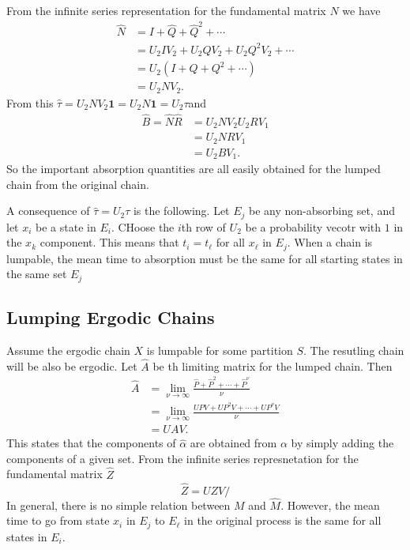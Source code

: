 \documentclass[12pt]{article}
\begin{document}
From the infinite series representation for the fundamental matrix $N$
we have
\begin{align*}
  \hat{N} &= I + \hat{Q} + \hat{Q}^2 + \cdots \\
          &= U_2 I V_2+ U_2 Q V_2 + U_2 Q^2 V_2 + \cdots \\
          &= U_2 (I +  Q  +  Q^2 + \cdots) \\
          &= U_2 N V_2.
\end{align*}
From this \( \hat{\tau} = U_2 N V_2 \mathbf{1} = U_2 N  \mathbf{1} =
U_2 \tau\)and
\begin{align*}
  \hat{B} = \hat{N} \hat{R} &= U_2 N V_2 U_2 R V_1 \\
                            &= U_2 N R V_1 \\
                            &= U_2 B V_1.
\end{align*}
So the important absorption quantities are all easily obtained for the
lumped chain from the original chain.

A consequence of $\hat{\tau} = U_2 \tau$ is the following.
Let $E_j$ be any non-absorbing set, and let $x_i$ be a state in
$E_i$.  CHoose the $i$th row of $U_2$ be a probability vecotr with $1$
in the $x_k$ component.  This means that $t_i = t_\ell$ for all $x_\ell$ in
$E_j$.  When a chain is lumpable, the mean time to absorption must be
the same for all starting states in the same set $E_j$

\subsection*{Lumping Ergodic Chains}

Assume the ergodic chain $X$ is lumpable for some partition $S$.  The
resutling chain will be also be ergodic.  Let $\hat{A}$ be th limiting
matrix for the lumped chain.  Then
\begin{align*}
  \hat{A} &= \lim_{\nu \to \infty} \frac{\hat{P} + \hat{P}^2 + \cdots +
            \hat{P}^{\nu}}{\nu} \\
  &= \lim_{\nu \to \infty} \frac{UPV + UP^2V + \cdots +
    UP^{\nu}V}{\nu} \\
  & = UAV.
\end{align*}
This states that the components of $\hat{\alpha}$ are obtained from
$\alpha$ by simply adding the components of a given set.  From the
infinite series represnetation for the fundamental matrix $\hat{Z}$
\[
  \hat{Z} = U Z V/
\]
In general, there is no simple relation between $M$ and $\hat{M}$.
However, the mean time to go from state $x_i$ in $E_j$ to $E_{\ell}$
in the original process is the same for all states in $E_i$.  
\end{document}
